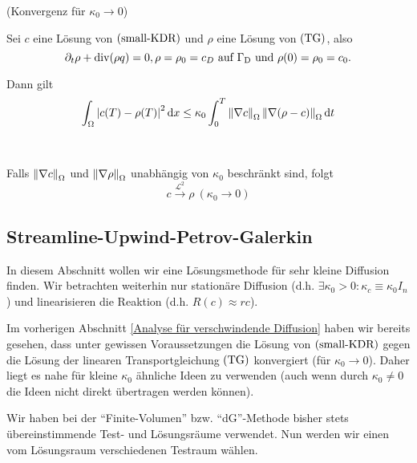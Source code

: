 %	

\begin{Lemma}(Konvergenz für $ \kappa_0 \to 0 $)
	
	Sei $ c $ eine Lösung von $ \operatorname{(small-KDR)} $ und $ \rho $ eine Lösung von $ \operatorname{(TG)} $, also 
	\[ \partial_t \rho + \operatorname{div}(\rho q) = 0, \rho = \rho_0 = c_D \text{ auf } \Gamma_{\text{D}} \text{ und }  \rho(0) = \rho_0 = c_0.  \]
	
	Dann gilt 
	\[ \int_\Omega \abs{c(T) - \rho(T)}^2 \mathop{}\!\mathrm{d} x \leq \kappa_0 \int_{0}^{T} \norm{\nabla c}_\Omega\, \norm{\nabla(\rho - c)}_\Omega \mathop{}\!\mathrm{d} t \]
\end{Lemma}

\begin{Korollar}~
	
	Falls $ \norm{\nabla c}_\Omega $ und $ \norm{\nabla \rho}_\Omega $ unabhängig von $ \kappa_0 $ beschränkt sind, folgt
	\[ c \stackrel{\mathcal{L}^2}{\to} \rho \ (\kappa_0 \to 0) \]
\end{Korollar}

\subsection{Streamline-Upwind-Petrov-Galerkin}
In diesem Abschnitt wollen wir eine Lösungsmethode für sehr kleine Diffusion finden. Wir betrachten weiterhin nur stationäre Diffusion (d.h. $ \exists \kappa_0 > 0: \kappa_c \equiv \kappa_0 I_n $) und linearisieren die Reaktion (d.h. $ R(c) \approx r c$).

Im vorherigen Abschnitt \ref{Analyse für verschwindende Diffusion} haben wir bereits gesehen, dass unter gewissen Voraussetzungen die Lösung von $ \operatorname{(small-KDR)} $ gegen die Lösung der linearen Transportgleichung $ \operatorname{(TG)} $ konvergiert (für $ \kappa_0 \to 0 $). Daher liegt es nahe für kleine $ \kappa_0  $ ähnliche Ideen zu verwenden (auch wenn durch $ \kappa_0 \neq 0 $ die Ideen nicht direkt übertragen werden können).

Wir haben bei der \enquote{Finite-Volumen} bzw. \enquote{dG}-Methode bisher stets übereinstimmende Test- und Lösungsräume verwendet. Nun werden wir einen vom Lösungsraum verschiedenen Testraum wählen.

